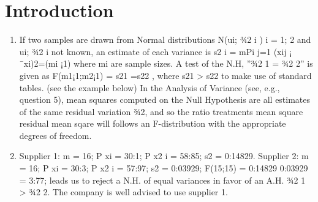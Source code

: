 \documentclass[a4paper,12pt]{article}
\begin{document}
\section{Introduction}
\begin{enumerate}
    \item If two samples are drawn from Normal distributions N(ui; ¾2
i ) i = 1; 2 and ui; ¾2
i not
known, an estimate of each variance is s2
i =
mPi
j=1
(xij ¡ ¯xi)2=(mi ¡1) where mi are sample
sizes. A test of the N.H, ”¾2
1 = ¾2
2” is given as F(m1¡1;m2¡1) = s21
=s22
, where s21
> s22
to
make use of standard tables. (see the example below)
In the Analysis of Variance (see, e.g., question 5), mean squares computed on the
Null Hypothesis are all estimates of the same residual variation ¾2, and so the ratio
treatments mean square
residual mean sqare will follows an F-distribution with the appropriate degrees of freedom.
\item Supplier 1: m = 16;
P
xi = 30:1;
P
x2
i = 58:85; s2 = 0:14829.
Supplier 2: m = 16;
P
xi = 30:3;
P
x2
i = 57:97; s2 = 0:03929; F(15;15) = 0:14829
0:03929 = 3:77;
leads us to reject a N.H. of equal variances in favor of an A.H. ¾2
1 > ¾2
2. The company is
well advised to use supplier 1.
\end{enumerate}
\end{document}
